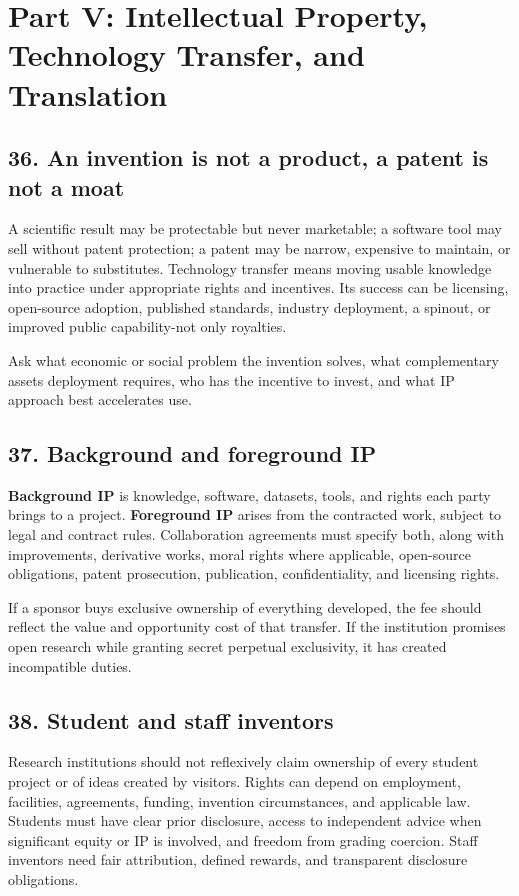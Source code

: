 \section{Part V: Intellectual Property, Technology Transfer, and Translation}

\subsection{36. An invention is not a product, a patent is not a moat}

A scientific result may be protectable but never marketable; a software tool may sell without patent protection; a patent may be narrow, expensive to maintain, or vulnerable to substitutes. Technology transfer means moving usable knowledge into practice under appropriate rights and incentives. Its success can be licensing, open-source adoption, published standards, industry deployment, a spinout, or improved public capability-not only royalties.

Ask what economic or social problem the invention solves, what complementary assets deployment requires, who has the incentive to invest, and what IP approach best accelerates use.

\subsection{37. Background and foreground IP}

\textbf{Background IP} is knowledge, software, datasets, tools, and rights each party brings to a project. \textbf{Foreground IP} arises from the contracted work, subject to legal and contract rules. Collaboration agreements must specify both, along with improvements, derivative works, moral rights where applicable, open-source obligations, patent prosecution, publication, confidentiality, and licensing rights.

If a sponsor buys exclusive ownership of everything developed, the fee should reflect the value and opportunity cost of that transfer. If the institution promises open research while granting secret perpetual exclusivity, it has created incompatible duties.

\subsection{38. Student and staff inventors}

Research institutions should not reflexively claim ownership of every student project or of ideas created by visitors. Rights can depend on employment, facilities, agreements, funding, invention circumstances, and applicable law. Students must have clear prior disclosure, access to independent advice when significant equity or IP is involved, and freedom from grading coercion. Staff inventors need fair attribution, defined rewards, and transparent disclosure obligations.

